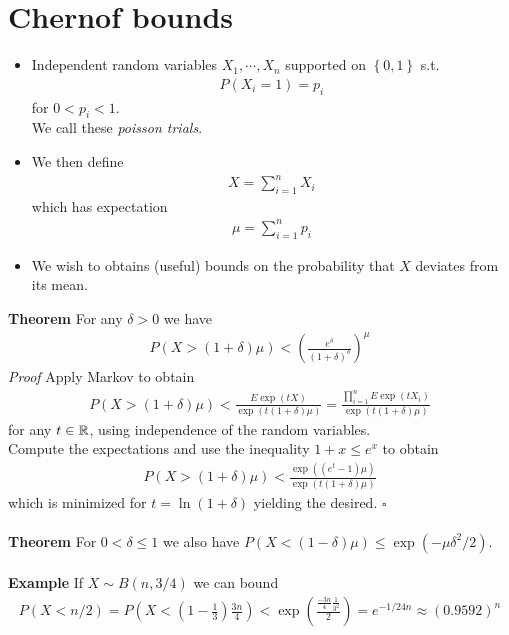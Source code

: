 \section*{Chernof bounds}
\begin{itemize}
	\item Independent random variables $X_1,\cdots,X_n$ supported on $\left\{ 0,1 \right\}$ s.t.
		\begin{align*}
			P\left( X_i=1 \right)=p_i
		\end{align*}
		for $0<p_i<1$. \\
		We call these \textit{poisson trials}.
	\item We then define
		\begin{align*}
			X=\sum_{i=1}^nX_i
		\end{align*}
		which has expectation
		\begin{align*}
			\mu=\sum_{i=1}^np_i
		\end{align*}
	\item We wish to obtains (useful) bounds on the probability that $X$ deviates from its mean.
\end{itemize}
\textbf{Theorem} \indent For any $\delta>0$ we have
\begin{align*}
	P\left( X>(1+\delta)\mu \right)< \left( \frac{e^{\delta}}{\left( 1+\delta \right)^{\delta}} \right)^{\mu}
\end{align*}
\textit{Proof} \indent Apply Markov to obtain
\begin{align*}
	P\left( X>\left( 1+\delta \right)\mu \right)<\frac{E \exp(tX)}{\exp(t(1+\delta)\mu)}
	=\frac{\prod_{i=1}^n E \exp(tX_i)}{\exp(t(1+\delta)\mu)}
\end{align*}
for any $t \in \mathbb{R}$, using independence of the random variables. \\
Compute the expectations and use the inequality $1+x \leq e^x$ to obtain
\begin{align*}
	P\left( X>(1+\delta)\mu \right) < \frac{\exp( (e^t-1)\mu)}{\exp( t(1+\delta)\mu)}
\end{align*}
which is minimized for $t=\ln(1+\delta)$ yielding the desired. \indent $\square$ \\ \\
\textbf{Theorem} \indent For $0 < \delta \leq 1$ we also have $P\left( X<(1-\delta)\mu \right) \leq \exp(-\mu\delta^2/2)$. \\ \\
\textbf{Example} \indent If $X \sim B(n,3/4)$ we can bound
\begin{align*}
	P(X<n/2)=P\left(X<\left(1-\frac{1}{3}\right)\frac{3n}{4}\right)
	< \exp\left( \frac{\frac{-3n}{4} \frac{1}{3^2}}{2}\right)= e^{-1/24n} \approx (0.9592)^n
\end{align*}

